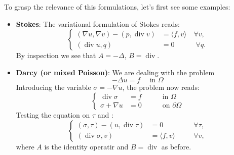 \documentclass{article}
\DeclareMathOperator{\dive}{\text{div}}
\begin{document}
To grasp the relevance of this formulations, let's first see
some examples:
\begin{itemize}
    \item \textbf{Stokes}: The variational formulation of
    Stokes reads:
    \begin{displaymath}
    \begin{cases}
        (\nabla u, \nabla v) - (p, \dive v)
        &=
        \langle f, v \rangle
        \quad\forall v,
        \\
        (\dive u, q) &= 0 \hspace{3em}\forall q.
    \end{cases}
    \end{displaymath}
    By inspection we see that \(A=-\Delta\), \(B=\dive\).

    \item \textbf{Darcy (or mixed Poisson)}: We are dealing 
    with the problem
    \begin{displaymath}
        -\Delta u = f\quad \text{ in } \Omega
    \end{displaymath}
    Introducing the variable \(\sigma = -\nabla u\), the problem
    now reads:
    \begin{displaymath}
    \left\{
    \begin{aligned}
        \dive \sigma &= f && \quad \text{ in } \Omega\\ 
        \sigma + \nabla u &= 0 && \quad \text{ on } \partial\Omega
    \end{aligned}
    \right.
    \end{displaymath}
    Testing the equation on \(\tau\) and :
    \begin{displaymath}
    \left\{
    \begin{aligned}
        (\sigma, \tau) - (u, \dive \tau) &= 0
        &&\quad\forall \tau, \\ 
        (\dive \sigma, v) &= \langle f,v \rangle
        &&\quad \forall v,
    \end{aligned}
    \right.
    \end{displaymath}
    where $A$ is the identity operatir and $B=\dive$ as before.


\end{itemize}
\end{document}
